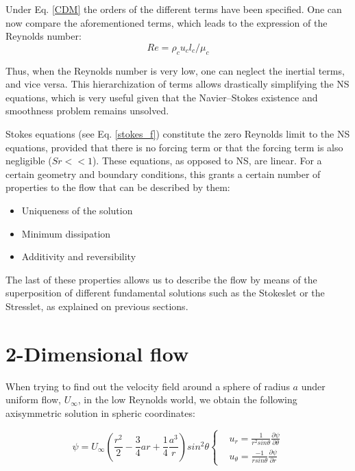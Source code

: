Under Eq. \ref{CDM} the orders of the different terms have been specified. One can now compare the aforementioned terms, which leads to the expression of the Reynolds number:
\begin{equation}
	Re = \rho_c u_c l_c/\mu_c
\end{equation}

Thus, when the Reynolds number is very low, one can neglect the inertial terms, and vice versa. This hierarchization of terms allows drastically simplifying the NS equations, which is very useful given that the Navier–Stokes existence and smoothness problem remains unsolved.

Stokes equations (see Eq. \ref{stokes_f}) constitute the zero Reynolds limit to the NS equations, provided that there is no forcing term or that the forcing term is also negligible ($Sr<<1$). These equations, as opposed to NS, are linear. For a certain geometry and boundary conditions, this grants a certain number of properties to the flow that can be described by them:

\begin{itemize}
	\item Uniqueness of the solution  
	\item Minimum dissipation
	\item Additivity and reversibility
\end{itemize}

The last of these properties allows us to describe the flow by means of the superposition of different fundamental solutions such as the Stokeslet or the Stresslet, as explained on previous sections.

\section{2-Dimensional flow}

When trying to find out the velocity field around a sphere of radius $a$ under uniform flow, $U_\infty$, in the low Reynolds world, we obtain the following axisymmetric solution in spheric coordinates:

\begin{equation}
\psi = U_\infty \left(\frac{r^2}{2} - \frac{3}{4}ar + \frac{1}{4} \frac{a^3}{r} \right) sin ^2 \theta
\left\{
\begin{aligned}
& u_r = \frac{1}{r^2 sin \theta} \frac{\partial \psi}{\partial \theta}\\
& u_\theta = \frac{-1}{r sin \theta} \frac{\partial \psi}{\partial r}
\end{aligned}
\right.
\end{equation}

